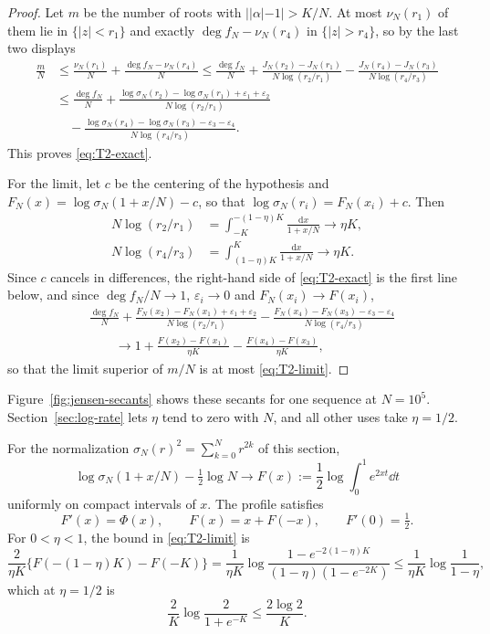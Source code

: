 \begin{proof}
Let $m$ be the number of roots with $||\alpha|-1|>K/N$. At most
$\nu_N(r_1)$ of them lie in $\{|z|<r_1\}$ and exactly
$\deg f_N-\nu_N(r_4)$ in $\{|z|>r_4\}$, so by the last two displays
\begin{align*}
 \frac mN
 &\leq\frac{\nu_N(r_1)}N+\frac{\deg f_N-\nu_N(r_4)}N
 \leq\frac{\deg f_N}N
   +\frac{J_N(r_2)-J_N(r_1)}{N\log(r_2/r_1)}
   -\frac{J_N(r_4)-J_N(r_3)}{N\log(r_4/r_3)}\\
 &\leq\frac{\deg f_N}N
   +\frac{\log\sigma_N(r_2)-\log\sigma_N(r_1)+\varepsilon_1+\varepsilon_2}{N\log(r_2/r_1)}\\
 &\quad-\frac{\log\sigma_N(r_4)-\log\sigma_N(r_3)-\varepsilon_3-\varepsilon_4}{N\log(r_4/r_3)}.
\end{align*}
This proves \eqref{eq:T2-exact}.

For the limit, let $c$ be the centering of the hypothesis and
$F_N(x)=\log\sigma_N(1+x/N)-c$, so that $\log\sigma_N(r_i)=F_N(x_i)+c$.
Then
\begin{align*}
 N\log(r_2/r_1)&=\int_{-K}^{-(1-\eta)K}\frac{\mathrm dx}{1+x/N}\longrightarrow\eta K,\\
 N\log(r_4/r_3)&=\int_{(1-\eta)K}^{K}\frac{\mathrm dx}{1+x/N}\longrightarrow\eta K.
\end{align*}
Since $c$ cancels in differences, the right-hand side of
\eqref{eq:T2-exact} is the first line below, and since $\deg f_N/N\to1$,
$\varepsilon_i\to0$ and $F_N(x_i)\to F(x_i)$,
\begin{align*}
 &\frac{\deg f_N}N
   +\frac{F_N(x_2)-F_N(x_1)+\varepsilon_1+\varepsilon_2}{N\log(r_2/r_1)}
 -\frac{F_N(x_4)-F_N(x_3)-\varepsilon_3-\varepsilon_4}{N\log(r_4/r_3)}\\
 &\qquad\longrightarrow1+\frac{F(x_2)-F(x_1)}{\eta K}-\frac{F(x_4)-F(x_3)}{\eta K},
\end{align*}
so that the limit superior of $m/N$ is at most \eqref{eq:T2-limit}.
\end{proof}

Figure~\ref{fig:jensen-secants} shows these secants for one sequence at $N=10^5$.
Section~\ref{sec:log-rate} lets $\eta$ tend to zero with $N$, and all
other uses take $\eta=1/2$.



\begin{proposition}\label{prop:profiles}
For the normalization $\sigma_N(r)^2=\sum_{k=0}^Nr^{2k}$ of this section,
\[
 \log\sigma_N(1+x/N)-\tfrac12\log N\longrightarrow
 F(x):=\frac12\log\int_0^1e^{2xt}\dd t
\]
uniformly on compact intervals of $x$. The profile satisfies
\[
 F'(x)=\Phi(x),\qquad F(x)=x+F(-x),\qquad F'(0)=\tfrac12.
\]
For $0<\eta<1$, the bound in \eqref{eq:T2-limit} is
\begin{equation}
 \frac2{\eta K}\{F(-(1-\eta)K)-F(-K)\}
 =\frac1{\eta K}\log\frac{1-e^{-2(1-\eta)K}}{(1-\eta)(1-e^{-2K})}
 \le\frac1{\eta K}\log\frac1{1-\eta},
 \label{eq:profile-eta-bound}
\end{equation}
which at $\eta=1/2$ is
\[
 \frac2K\log\frac{2}{1+e^{-K}}\leq\frac{2\log2}{K}.
\]
\end{proposition}

